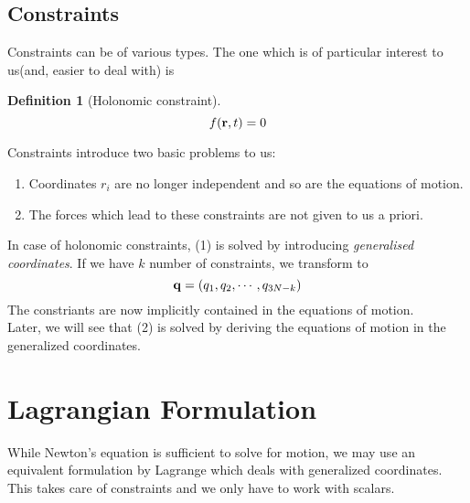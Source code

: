 \documentclass[10pt, a4paper]{extarticle}
\theoremstyle{definition}
\newtheorem{defn}{Definition}
\begin{document}
\subsection{Constraints}
Constraints can be of various types. The one which is of particular interest to us(and, easier to deal with) is
\begin{framed}
	\begin{defn}[Holonomic constraint]
		\[f(\vb{r},t)=0\]
	\end{defn}
\end{framed}
Constraints introduce two basic problems to us:
\begin{framed}
	\begin{enumerate}
		\item Coordinates $r_i$ are no longer independent and so are the equations of motion.
		\item The forces which lead to these constraints are not given to us a priori.
	\end{enumerate}
	In case of holonomic constraints, (1) is solved by introducing \emph{generalised coordinates}. If we have $k$ number of constraints, we transform to
	\[ \vb{q}=(q_1,q_2,\cdots,q_{3N-k})\]
	The constriants are now implicitly contained in the equations of motion.\\
	Later, we will see that (2) is solved by deriving the equations of motion in the generalized coordinates.
\end{framed}

\section{Lagrangian Formulation}
While Newton's equation is sufficient to solve for motion, we may use an equivalent formulation by Lagrange which deals with generalized coordinates. This takes care of constraints and we only have to work with scalars.
\end{document}
